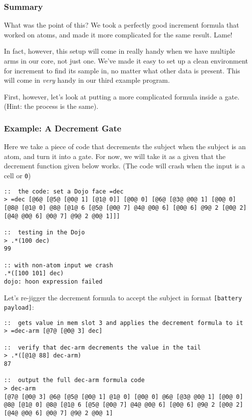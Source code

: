 \documentclass[twoside]{article}
\begin{document}
\subsubsection{Summary}

What was the point of this? We took a perfectly good increment formula that worked on atoms, and made it more complicated for the same result. Lame!

In fact, however, this setup will come in really handy when we have multiple arms in our core, not just one. We've made it easy to set up a clean environment for increment to find its sample in, no matter what other data is present. This will come in \emph{very} handy in our third example program.

First, however, let's look at putting a more complicated formula inside a gate. (Hint: the process is the same).

\subsubsection{Example:  A Decrement Gate}

Here we take a piece of code that decrements the subject when the subject is an atom, and turn it into a gate.  For now, we will take it as a given that the decrement function given below works. (The code will crash when the input is a cell or \lstinline[style=inlinecode]{0})

\begin{lstlisting}[style=listingcode]
::  the code: set a Dojo face =dec
> =dec [@6@ [@5@ [@0@ 1] [@1@ 0]] [@0@ 0] [@6@ [@3@ @0@ 1] [@0@ 0] [@8@ [@1@ 0] @8@ [@1@ 6 [@5@ [@0@ 7] @4@ @0@ 6] [@0@ 6] @9@ 2 [@0@ 2] [@4@ @0@ 6] @0@ 7] @9@ 2 @0@ 1]]]

::  testing in the Dojo
> .*(100 dec)
99

:: with non-atom input we crash
.*([100 101] dec)
dojo: hoon expression failed
\end{lstlisting}

Let's re-jigger the decrement formula to accept the subject in format \lstinline[style=inlinecode]{[battery payload]}:

\begin{lstlisting}[style=listingblock]
::  gets value in mem slot 3 and applies the decrement formula to it
> =dec-arm [@7@ [@0@ 3] dec]

::  verify that dec-arm decrements the value in the tail
> .*([@1@ 88] dec-arm)
87

::  output the full dec-arm formula code
> dec-arm
[@7@ [@0@ 3] @6@ [@5@ [@0@ 1] @1@ 0] [@0@ 0] @6@ [@3@ @0@ 1] [@0@ 0] @8@ [@1@ 0] @8@ [@1@ 6 [@5@ [@0@ 7] @4@ @0@ 6] [@0@ 6] @9@ 2 [@0@ 2] [@4@ @0@ 6] @0@ 7] @9@ 2 @0@ 1]
\end{lstlisting}
\end{document}
